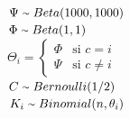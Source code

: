 \begin{minipage}[t]{\dimexpr\linewidth-5.5cm\relax}
    \raggedleft{}
\end{minipage}\hfill
\begin{minipage}[t]{0.7\textwidth}
  \begin{flushleft}
  \large
    ~\\
    $\Psi \; {\raise.17ex\hbox{$\scriptstyle\sim$}} \; Beta(1000, 1000)$\vspace*{0.3cm} \\
    $\Phi \; {\raise.17ex\hbox{$\scriptstyle\sim$}} \; Beta(1,1)$\vspace*{0.3cm} \\
    $\Theta_{i} = \left\{
	  \begin{array}{ll}
		  \Phi  & \mbox{si } c = i \\
		  \Psi & \mbox{si } c \neq i
	  \end{array}
    \right.$\vspace*{0.3cm} \\
    $C \; {\raise.17ex\hbox{$\scriptstyle\sim$}} \; Bernoulli(1/2)$\vspace*{0.3cm} \\
    $K_{i} \; {\raise.17ex\hbox{$\scriptstyle\sim$}} \; Binomial(n, \theta_{i})$  
  \end{flushleft}  
\end{minipage}

~\\ \\